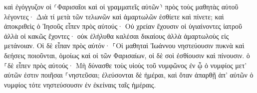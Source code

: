 \documentclass{openreader}
\begin{document}
καὶ ἐγόγγυζον οἱ ⸂Φαρισαῖοι καὶ οἱ γραμματεῖς αὐτῶν⸃ πρὸς τοὺς μαθητὰς αὐτοῦ λέγοντες· Διὰ τί μετὰ τῶν τελωνῶν καὶ ἁμαρτωλῶν ἐσθίετε καὶ πίνετε; 
καὶ ἀποκριθεὶς ὁ Ἰησοῦς εἶπεν πρὸς αὐτούς· Οὐ χρείαν ἔχουσιν οἱ ὑγιαίνοντες ἰατροῦ ἀλλὰ οἱ κακῶς ἔχοντες· 
οὐκ ἐλήλυθα καλέσαι δικαίους ἀλλὰ ἁμαρτωλοὺς εἰς μετάνοιαν. 
Οἱ δὲ εἶπαν πρὸς αὐτόν· ⸀Οἱ μαθηταὶ Ἰωάννου νηστεύουσιν πυκνὰ καὶ δεήσεις ποιοῦνται, ὁμοίως καὶ οἱ τῶν Φαρισαίων, οἱ δὲ σοὶ ἐσθίουσιν καὶ πίνουσιν. 
ὁ ⸀δὲ εἶπεν πρὸς αὐτούς· Μὴ δύνασθε τοὺς υἱοὺς τοῦ νυμφῶνος ἐν ᾧ ὁ νυμφίος μετ’ αὐτῶν ἐστιν ποιῆσαι ⸀νηστεῦσαι; 
ἐλεύσονται δὲ ἡμέραι, καὶ ὅταν ἀπαρθῇ ἀπ’ αὐτῶν ὁ νυμφίος τότε νηστεύσουσιν ἐν ἐκείναις ταῖς ἡμέραις. 
\end{document}
